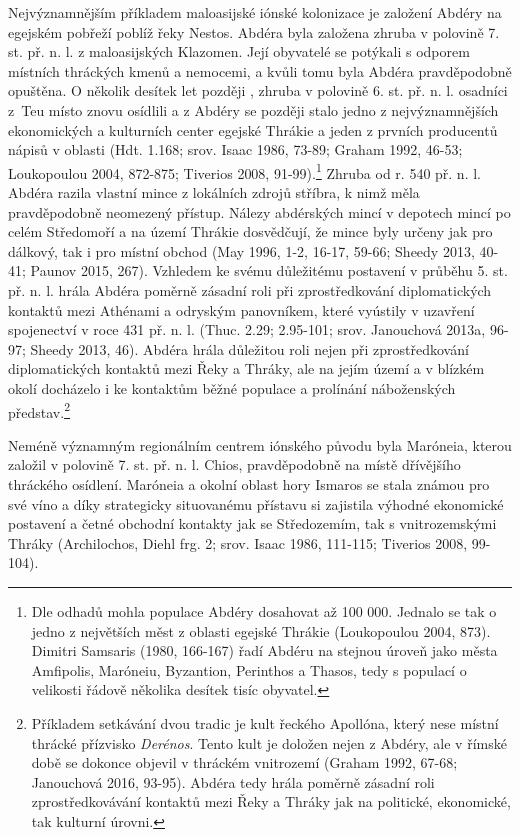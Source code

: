 Nejvýznamnějším příkladem maloasijské iónské kolonizace je založení Abdéry na egejském pobřeží poblíž řeky Nestos. Abdéra byla založena zhruba v polovině 7. st. př. n. l. z maloasijských Klazomen. Její obyvatelé se potýkali s odporem místních thráckých kmenů a nemocemi, a kvůli tomu byla Abdéra pravděpodobně opuštěna. O několik desítek let později , zhruba v polovině 6. st. př. n. l. osadníci z~Teu místo znovu osídlili a z Abdéry se později stalo jedno z nejvýznamnějších ekonomických a kulturních center egejské Thrákie a jeden z prvních producentů nápisů v oblasti (Hdt. 1.168; srov. Isaac 1986, 73-89; Graham 1992, 46-53; Loukopoulou 2004, 872-875; Tiverios 2008, 91-99).\footnote{Dle odhadů mohla populace Abdéry dosahovat až 100 000. Jednalo se tak o jedno z největších měst z oblasti egejské Thrákie (Loukopoulou 2004, 873). Dimitri Samsaris (1980, 166-167) řadí Abdéru na stejnou úroveň jako města Amfipolis, Maróneiu, Byzantion, Perinthos a Thasos, tedy s populací o velikosti řádově několika desítek tisíc obyvatel.} Zhruba od r. 540 př. n. l. Abdéra razila vlastní mince z lokálních zdrojů stříbra, k nimž měla pravděpodobně neomezený přístup. Nálezy abdérských mincí v depotech mincí po celém Středomoří a na území Thrákie dosvědčují, že mince byly určeny jak pro dálkový, tak i pro místní obchod (May 1996, 1-2, 16-17, 59-66; Sheedy 2013, 40-41; Paunov 2015, 267). Vzhledem ke svému důležitému postavení v průběhu 5. st. př. n. l. hrála Abdéra poměrně zásadní roli při zprostředkování diplomatických kontaktů mezi Athénami a odryským panovníkem, které vyústily v uzavření spojenectví v roce 431 př. n. l. (Thuc. 2.29; 2.95-101; srov. Janouchová 2013a, 96-97; Sheedy 2013, 46). Abdéra hrála důležitou roli nejen při zprostředkování diplomatických kontaktů mezi Řeky a Thráky, ale na jejím území a v blízkém okolí docházelo i ke kontaktům běžné populace a prolínání náboženských představ.\footnote{Příkladem setkávání dvou tradic je kult řeckého Apollóna, který nese místní thrácké přízvisko {\em Derénos}. Tento kult je doložen nejen z Abdéry, ale v římské době se dokonce objevil v thráckém vnitrozemí (Graham 1992, 67-68; Janouchová 2016, 93-95). Abdéra tedy hrála poměrně zásadní roli zprostředkovávání kontaktů mezi Řeky a Thráky jak na politické, ekonomické, tak kulturní úrovni.}

Neméně významným regionálním centrem iónského původu byla Maróneia, kterou založil v polovině 7. st. př. n. l. Chios, pravděpodobně na místě dřívějšího thráckého osídlení. Maróneia a okolní oblast hory Ismaros se stala známou pro své víno a díky strategicky situovanému přístavu si zajistila výhodné ekonomické postavení a četné obchodní kontakty jak se Středozemím, tak s vnitrozemskými Thráky (Archilochos, Diehl frg. 2; srov. Isaac 1986, 111-115; Tiverios 2008, 99-104).

